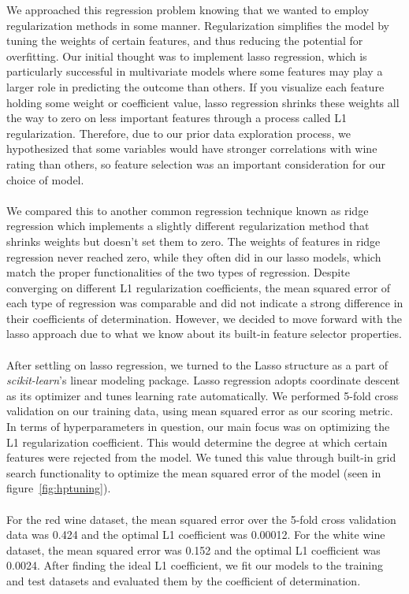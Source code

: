 We approached this regression problem knowing that we wanted to employ regularization methods in some manner. Regularization simplifies the model by tuning the weights of certain features, and thus reducing the potential for overfitting. Our initial thought was to implement lasso regression, which is particularly successful in multivariate models where some features may play a larger role in predicting the outcome than others. If you visualize each feature holding some weight or coefficient value, lasso regression shrinks these weights all the way to zero on less important features through a process called L1 regularization. Therefore, due to our prior data exploration process, we hypothesized that some variables would have stronger correlations with wine rating than others, so feature selection was an important consideration for our choice of model. \\\\
We compared this to another common regression technique known as ridge regression which implements a slightly different regularization method that shrinks weights but doesn’t set them to zero. The weights of features in ridge regression never reached zero, while they often did in our lasso models, which match the proper functionalities of the two types of regression. Despite converging on different L1 regularization coefficients, the mean squared error of each type of regression was comparable and did not indicate a strong difference in their coefficients of determination. However, we decided to move forward with the lasso approach due to what we know about its built-in feature selector properties. \\\\
After settling on lasso regression, we turned to the Lasso structure as a part of \textit{scikit-learn}’s linear modeling package. Lasso regression adopts coordinate descent as its optimizer and tunes learning rate automatically. We performed 5-fold cross validation on our training data, using mean squared error as our scoring metric. In terms of hyperparameters in question, our main focus was on optimizing the L1 regularization coefficient. This would determine the degree at which certain features were rejected from the model. We tuned this value through built-in grid search functionality to optimize the mean squared error of the model (seen in figure~\ref{fig:hptuning}). \\\\
For the red wine dataset, the mean squared error over the 5-fold cross validation data was 0.424 and the optimal L1 coefficient was 0.00012. For the white wine dataset, the mean squared error was 0.152 and the optimal L1 coefficient was 0.0024. After finding the ideal L1 coefficient, we fit our models to the training and test datasets and evaluated them by the coefficient of determination. \\\\